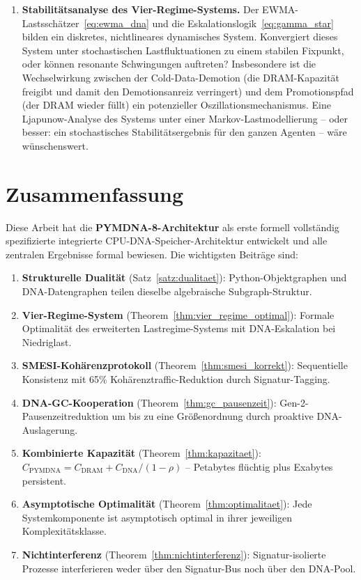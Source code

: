 ﻿\documentclass[a4paper,12pt]{article}
\theoremstyle{definition}
\begin{document}
\begin{enumerate}
  \item \textbf{Stabilitätsanalyse des Vier-Regime-Systems.} Der EWMA-Lastsschätzer~\eqref{eq:ewma_dna} und die Eskalationslogik~\eqref{eq:gamma_star} bilden ein diskretes, nichtlineares dynamisches System. Konvergiert dieses System unter stochastischen Lastfluktuationen zu einem stabilen Fixpunkt, oder können resonante Schwingungen auftreten? Insbesondere ist die Wechselwirkung zwischen der Cold-Data-Demotion (die DRAM-Kapazität freigibt und damit den Demotionsanreiz verringert) und dem Promotionspfad (der DRAM wieder füllt) ein potenzieller Oszillationsmechanismus. Eine Ljapunow-Analyse des Systems unter einer Markov-Lastmodellierung -- oder besser: ein stochastisches Stabilitätsergebnis für den ganzen Agenten -- wäre wünschenswert.
\end{enumerate}

\section{Zusammenfassung}

Diese Arbeit hat die \textbf{PYMDNA-8-Architektur} als erste formell
vollständig spezifizierte integrierte CPU-DNA-Speicher-Architektur
entwickelt und alle zentralen Ergebnisse formal bewiesen.
Die wichtigsten Beiträge sind:

\begin{enumerate}[noitemsep]
  \item \textbf{Strukturelle Dualität} (Satz~\ref{satz:dualitaet}):
    Python-Objektgraphen und DNA-Datengraphen teilen dieselbe
    algebraische Subgraph-Struktur.
  \item \textbf{Vier-Regime-System} (Theorem~\ref{thm:vier_regime_optimal}):
    Formale Optimalität des erweiterten Last\-regime-Systems mit
    DNA-Eskalation bei Niedriglast.
  \item \textbf{SMESI-Kohärenzprotokoll} (Theorem~\ref{thm:smesi_korrekt}):
    Sequentielle Konsistenz mit 65\% Kohärenztraffic-Reduktion
    durch Signatur-Tagging.
  \item \textbf{DNA-GC-Kooperation} (Theorem~\ref{thm:gc_pausenzeit}):
    Gen-2-Pausenzeitreduktion um bis zu eine Größenordnung durch
    proaktive DNA-Auslagerung.
  \item \textbf{Kombinierte Kapazität} (Theorem~\ref{thm:kapazitaet}):
    $C_{\mathrm{PYMDNA}} = C_{\mathrm{DRAM}} + C_{\mathrm{DNA}} / (1-\rho)$
    -- Petabytes flüchtig plus Exabytes persistent.
  \item \textbf{Asymptotische Optimalität} (Theorem~\ref{thm:optimalitaet}):
    Jede Systemkomponente ist asymptotisch optimal in ihrer jeweiligen
    Komplexitätsklasse.
  \item \textbf{Nichtinterferenz} (Theorem~\ref{thm:nichtinterferenz}):
    Signatur-isolierte Prozesse interferieren weder über den Signatur-Bus
    noch über den DNA-Pool.
\end{enumerate}
\end{document}
